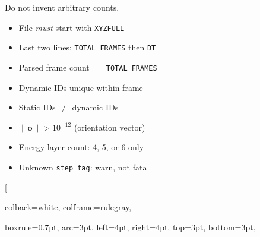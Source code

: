 \documentclass[12pt, a4paper, oneside]{article}
\begin{document}
\begin{tcolorbox}
\begin{multicols}{2}
\begin{tcolorbox}
Do not invent arbitrary counts.

\end{tcolorbox}


\columnbreak



\begin{tcolorbox}[

  colback=specgoldlight, colframe=specgold,

  boxrule=0.7pt, arc=3pt, left=4pt, right=4pt, top=3pt, bottom=3pt,

  title={\bfseries\small Key Constraints},

  fonttitle=\small\bfseries, attach title to upper, after title={\\[2pt]}

]

\small

\begin{itemize}[leftmargin=1em]

  \item File \emph{must} start with \texttt{XYZFULL}

  \item Last two lines: \texttt{TOTAL\_FRAMES} then \texttt{DT}

  \item Parsed frame count $=$ \texttt{TOTAL\_FRAMES}

  \item Dynamic IDs unique within frame

  \item Static IDs $\neq$ dynamic IDs

  \item $\|\mathbf{o}\| > 10^{-12}$ (orientation vector)

  \item Energy layer count: 4, 5, or 6 only

  \item Unknown \texttt{step\_tag}: warn, not fatal

\end{itemize}

\end{tcolorbox}


\medskip


\begin{tcolorbox}[

  colback=white, colframe=rulegray,

  boxrule=0.7pt, arc=3pt, left=4pt, right=4pt, top=3pt, bottom=3pt,


\end{tcolorbox}
\end{multicols}
\end{tcolorbox}
\end{document}
